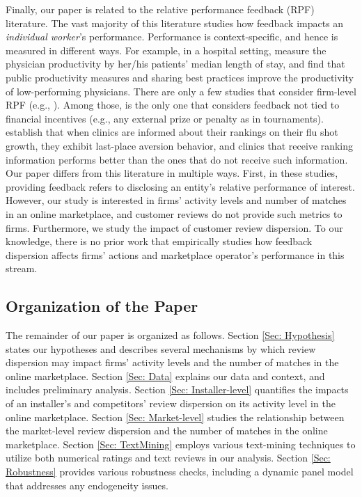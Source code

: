 \documentclass[msom,blindrev]{informs3}
\begin{document}
Finally, our paper is related to the relative performance feedback (RPF) literature. The vast majority of this literature studies how feedback impacts an \emph{individual worker}'s performance. Performance is context-specific, and hence is measured in different ways. For example, in a hospital setting, \cite{song2017closing} measure the physician productivity by her/his patients' median length of stay, and find that public productivity measures and sharing best practices improve the productivity of low-performing physicians. There are only a few studies that consider firm-level RPF (e.g., \cite{josse2013}). Among those, \cite{staats} is the only one that considers feedback not tied to financial incentives (e.g., any external prize or penalty as in tournaments). \cite{staats} establish that when clinics are informed about their rankings on their flu shot growth, they exhibit last-place aversion behavior, and clinics that receive ranking information performs better than the ones that do not receive such information. Our paper differs from this literature in multiple ways. First, in these studies, providing feedback refers to disclosing an entity's relative performance of interest. However, our study is interested in firms' activity levels and number of matches in an online marketplace, and customer reviews do not provide such metrics to firms. Furthermore, we study the impact of customer review dispersion. To our knowledge, there is no prior work that empirically studies how feedback dispersion affects firms' actions and marketplace operator's performance in this stream.

\subsection{Organization of the Paper}

The remainder of our paper is organized as follows. Section \ref{Sec: Hypothesis} states our hypotheses and describes several mechanisms by which review dispersion may impact firms' activity levels and the number of matches in the online marketplace. Section \ref{Sec: Data} explains our data and context, and includes preliminary analysis. Section \ref{Sec: Installer-level} quantifies the impacts of an installer's and competitors' review dispersion on its activity level in the online marketplace. Section \ref{Sec: Market-level} studies the relationship between the market-level review dispersion and the number of matches in the online marketplace. Section \ref{Sec: TextMining} employs various text-mining techniques to utilize both numerical ratings and text reviews in our analysis. Section \ref{Sec: Robustness}  provides various robustness checks, including a dynamic panel model that addresses any endogeneity issues.
\end{document}
